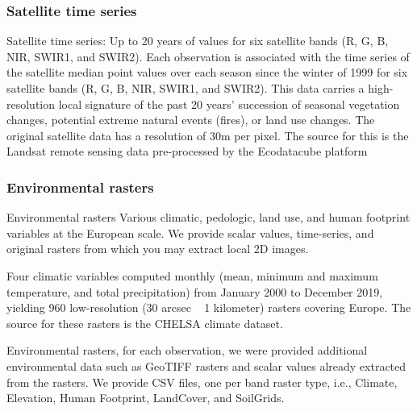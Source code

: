 \subsubsection{Satellite time series}

Satellite time series: Up to 20 years of values for six satellite bands (R, G, B, NIR, SWIR1, and SWIR2). Each observation is associated with the time series of the satellite median point values over each season since the winter of 1999 for six satellite bands (R, G, B, NIR, SWIR1, and SWIR2). This data carries a high-resolution local signature of the past 20 years' succession of seasonal vegetation changes, potential extreme natural events (fires), or land use changes. The original satellite data has a resolution of 30m per pixel. The source for this is the Landsat remote sensing data pre-processed by the Ecodatacube platform

\subsubsection{Environmental rasters}

Environmental rasters Various climatic, pedologic, land use, and human footprint variables at the European scale. We provide scalar values, time-series, and original rasters from which you may extract local 2D images.

Four climatic variables computed monthly (mean, minimum and maximum temperature, and total precipitation) from January 2000 to December 2019, yielding 960 low-resolution (30 arcsec ~ 1 kilometer) rasters covering Europe. The source for these rasters is the CHELSA climate dataset.

Environmental rasters, for each observation, we were provided additional environmental data such as GeoTIFF rasters and scalar values already extracted from the rasters. We provide CSV files, one per band raster type, i.e., Climate, Elevation, Human Footprint, LandCover, and SoilGrids.

